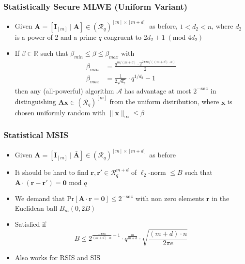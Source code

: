 \documentclass[t, aspectratio=169]{beamer}
\begin{document}
\begin{frame}
    \frametitle{Statistically Secure MLWE (Uniform Variant)}
    \begin{itemize}[<+->]
        \item Given $\mathbf{A} = [ \mathbf{I}_{[m]} \mid \bar{\mathbf{A}}] \in (\mathcal{R}_q)^{[m] \times [m+d]}$ as before, $1 < d_2 < n$, where $d_2$ is a power of 2 and a prime $q$ congruent to $2d_2 + 1 \;(\text{mod } 4d_2)$
        \item If $\beta\in \mathbb{R}$ such that $\beta_{min} \leq \beta \leq \beta_{max}$ with
              \begin{align*}
                  \beta_{min} & = \frac{q^{m/(m+d)} \cdot 2^{2 \texttt{sec}/((m+d)\cdot n)}}{2} \\
                  \beta_{max} & = \frac{1}{2\sqrt{d_2}} \cdot q^{1/d_2} - 1
              \end{align*}\pause
              then  any (all-powerful) algorithm $\mathcal{A}$ has advantage at most $2^{-\texttt{sec}}$ in distinguishing $\mathbf{A}\mathbf{x} \in (\mathcal{R}_q)^{[m]}$ from the uniform distribution, where $\mathbf{x}$ is chosen uniformly random with $\|\mathbf{x}\|_\infty \leq \beta$
    \end{itemize}
\end{frame}
\begin{frame}
    \frametitle{Statistical MSIS}
    \begin{itemize}[<+->]
        \item Given $\mathbf{A} = [ \mathbf{I}_{[m]} \mid \bar{\mathbf{A}}] \in (\mathcal{R}_q)^{[m] \times [m+d]}$ as before
        \item It should be hard to find $\mathbf{r}, \mathbf{r}' \in \mathcal{R}_q^{m+d}$ of $\ell_2$-norm $\leq B$ such that $\mathbf{A} \cdot (\mathbf{r} - \mathbf{r}') = \mathbf{0} \text{ mod } q$
        \item We demand that $\text{Pr}[\mathbf{A} \cdot \mathbf{r} = \mathbf{0}] \leq 2^{- \texttt{sec}}$ with non zero elements $\mathbf{r}$ in the Euclidean ball $B_{m}(0, 2B)$
        \item Satisfied if
              \begin{equation*}
                  B \leq 2^{\frac{-\texttt{sec}}{(m+d)\cdot n} - 1} \cdot q^\frac{m}{m+d} \cdot \sqrt{\frac{(m+d)\cdot n}{2 \pi e}}
              \end{equation*}
        \item Also works for RSIS and SIS
    \end{itemize}
\end{frame}
\end{document}
